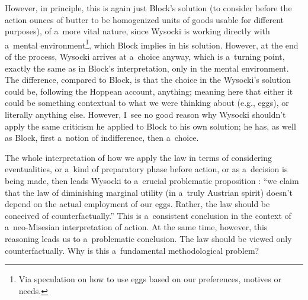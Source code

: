 However, in principle, this is again just Block's solution (to consider before the action ounces of butter to be homogenized units of goods usable for different purposes), of a~more vital nature, since Wysocki is working directly with a~mental environment\footnote{Via speculation on how to use eggs based on our preferences, motives or needs.}, which Block implies in his solution. However, at the end of the process, Wysocki arrives at a~choice anyway, which is a~turning point, exactly the same as in Block's interpretation, only in the mental environment. The difference, compared to Block, is that the choice in the Wysocki's solution could be, following the Hoppean account, anything; meaning here that either it could be something contextual to what we were thinking about (e.g., eggs), or literally anything else. However, I~see no good reason why Wysocki shouldn't apply the same criticism he applied to Block to his own solution; he has, as well as Block, first a~notion of indifference, then a~choice.



The whole interpretation of how we apply the law in terms of considering eventualities, or a~kind of preparatory phase before action, or as a~decision is being made, then leads Wysocki to a~crucial problematic proposition 
\parencite[][pp.41–42]{}: %
 ``we claim that the law of diminishing marginal utility (in a~truly Austrian spirit) doesn't depend on the actual employment of our eggs. Rather, the law should be conceived of counterfactually.'' This is a~consistent conclusion in the context of a~neo-Misesian interpretation of action. At the same time, however, this reasoning leads us to a~problematic conclusion. The law should be viewed only counterfactually. Why is this a~fundamental methodological problem?



